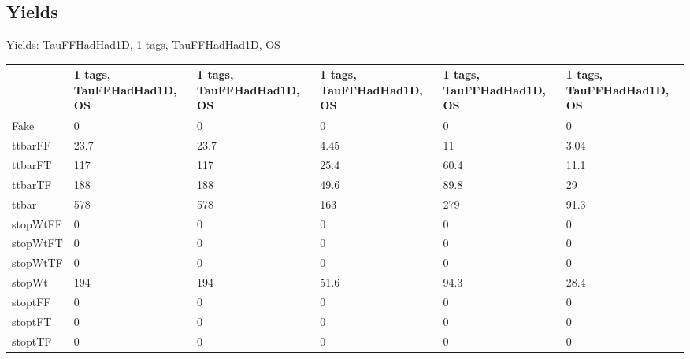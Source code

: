 
\subsection{Yields}

\begin{frame}{Yields: TauFFHadHad1D, 1 tags, TauFFHadHad1D, OS}
\begin{center}
  \begin{tabular}{l| >{\centering\let\newline\\\arraybackslash\hspace{0pt}}m{1.4cm}| >{\centering\let\newline\\\arraybackslash\hspace{0pt}}m{1.4cm}| >{\centering\let\newline\\\arraybackslash\hspace{0pt}}m{1.4cm}| >{\centering\let\newline\\\arraybackslash\hspace{0pt}}m{1.4cm}| >{\centering\let\newline\\\arraybackslash\hspace{0pt}}m{1.4cm}}
    & 1 tags, TauFFHadHad1D, OS & 1 tags, TauFFHadHad1D, OS & 1 tags, TauFFHadHad1D, OS & 1 tags, TauFFHadHad1D, OS & 1 tags, TauFFHadHad1D, OS \\
 \hline \hline
    Fake& 0 & 0 & 0 & 0 & 0 \\
 \hline
    ttbarFF& 23.7 & 23.7 & 4.45 & 11 & 3.04 \\
 \hline
    ttbarFT& 117 & 117 & 25.4 & 60.4 & 11.1 \\
 \hline
    ttbarTF& 188 & 188 & 49.6 & 89.8 & 29 \\
 \hline
    ttbar& 578 & 578 & 163 & 279 & 91.3 \\
 \hline
    stopWtFF& 0 & 0 & 0 & 0 & 0 \\
 \hline
    stopWtFT& 0 & 0 & 0 & 0 & 0 \\
 \hline
    stopWtTF& 0 & 0 & 0 & 0 & 0 \\
 \hline
    stopWt& 194 & 194 & 51.6 & 94.3 & 28.4 \\
 \hline
    stoptFF& 0 & 0 & 0 & 0 & 0 \\
 \hline
    stoptFT& 0 & 0 & 0 & 0 & 0 \\
 \hline
    stoptTF& 0 & 0 & 0 & 0 & 0 \\
 \hline

\end{tabular}
\end{center}
\end{frame}
